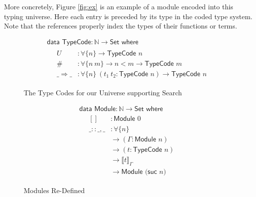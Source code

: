 \documentclass[acmsmall,review,authorversion]{acmart}
\newcommand{\type}[1]{\textsf{#1}}
\newcommand{\Set}{\type{Set}}
\newcommand{\Interp}[1]{\llbracket #1 \rrbracket}
\newcommand{\?}{\stackrel{?}{\approx}}
\newcommand{\data}[2]{\textsf{data } #1 : #2 \textsf{ where}}
\begin{document}
More concretely, Figure \ref{fig:ex} is an example of a module encoded into this
typing universe. Here each entry is preceded by its type in the coded type
system. Note that the references properly index the types of their functions or
terms.

\begin{figure}[t]
  \centering
$$  
  \begin{array}{l}
    \data{\textsf{TypeCode}}{\mathbb{N} \rightarrow \Set}\\
    \quad
    \begin{array}{ll}
      U &: \forall \{ n \} \rightarrow \textsf{TypeCode } n\\
      \# &: \forall \{ n\ m \} \rightarrow n < m \rightarrow \textsf{TypeCode } m\\
      \_\Rightarrow\_ &: \forall \{ n \}\ (t_1\ t_2 : \textsf{TypeCode } n)
                        \rightarrow \textsf{TypeCode } n
    \end{array}

  \end{array}
  $$
  \caption{The Type Codes for our Universe supporting Search}
  \label{fig:codes}
\end{figure}


\begin{figure}[b]
  $$
  \begin{array}{l}
    \data{\textsf{Module}}{\mathbb{N} \rightarrow \Set}\\
    \quad \begin{array}{ll}
            []        &: \textsf{Module } 0\\
            \_::\_,\_ &: \forall \{ n \}\\
                      &\rightarrow  (\Gamma : \textsf{Module } n)\\
                      &\rightarrow  (t : \textsf{TypeCode } n)\\
                      &\rightarrow  \Interp{ t }_\Gamma \\
                      &\rightarrow \textsf{Module (suc }  n)
          \end{array}
  \end{array}
$$
\caption{Modules Re-Defined}
\label{fig:mods}
\end{figure} 
\end{document}

